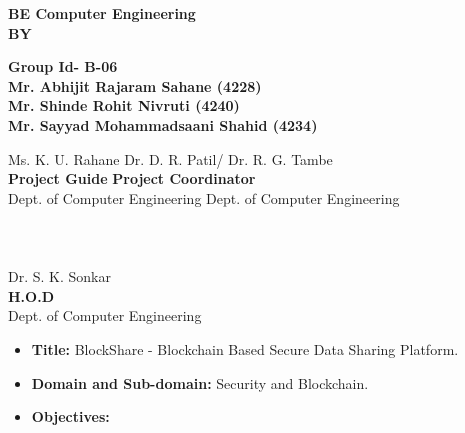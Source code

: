 \documentclass[12pt]{report}	%
\begin{document}
{\begin{center}
\bf {BE Computer Engineering}\\
BY
\end{center}
{\begin{center}
\textbf{Group Id- B-06}\\
\textbf{Mr. Abhijit Rajaram Sahane (4228)}\\
\textbf{Mr. Shinde Rohit Nivruti (4240)}\\
\textbf{Mr. Sayyad Mohammadsaani Shahid (4234)}\\
\end{center}


\vspace*{0.6in}
\hspace*{0.0in}Ms. K. U. Rahane \hspace{1.7in} Dr. D. R. Patil/ Dr. R. G. Tambe\\
\hspace*{0.3in} \textbf{Project Guide} \hspace{2.3in} \textbf{Project Coordinator}\\
Dept. of Computer Engineering \hspace{1.2in} Dept. of Computer Engineering\\
\\
\\
\\
\hspace*{2.3in}Dr. S. K. Sonkar\\
\hspace*{2.7in} \textbf{H.O.D}\\
\hspace*{1.9in}Dept. of Computer Engineering 
\\


\newpage
{} 

\begin{itemize}

\item{\textbf{Title:}} BlockShare - Blockchain Based Secure Data Sharing Platform.
\item{\textbf{Domain and Sub-domain:}} 
Security and Blockchain.
\item{\textbf{Objectives:}}


\end{itemize}}}
\end{document}

